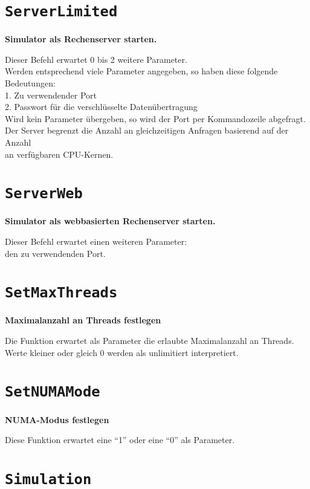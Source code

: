 \section{\texttt{ServerLimited}}

\textbf{Simulator als Rechenserver starten.}

Dieser Befehl erwartet 0 bis 2 weitere Parameter.\\
Werden entsprechend viele Parameter angegeben, so haben diese folgende Bedeutungen:\\
1. Zu verwendender Port\\
2. Passwort für die verschlüsselte Datenübertragung\\
Wird kein Parameter übergeben, so wird der Port per Kommandozeile abgefragt.\\
Der Server begrenzt die Anzahl an gleichzeitigen Anfragen basierend auf der Anzahl\\
an verfügbaren CPU-Kernen.

\section{\texttt{ServerWeb}}

\textbf{Simulator als webbasierten Rechenserver starten.}

Dieser Befehl erwartet einen weiteren Parameter:\\
den zu verwendenden Port.

\section{\texttt{SetMaxThreads}}

\textbf{Maximalanzahl an Threads festlegen}

Die Funktion erwartet als Parameter die erlaubte Maximalanzahl an Threads.\\
Werte kleiner oder gleich 0 werden als unlimitiert interpretiert.

\section{\texttt{SetNUMAMode}}

\textbf{NUMA-Modus festlegen}

Diese Funktion erwartet eine "`1"' oder eine "`0"' als Parameter.

\section{\texttt{Simulation}}

